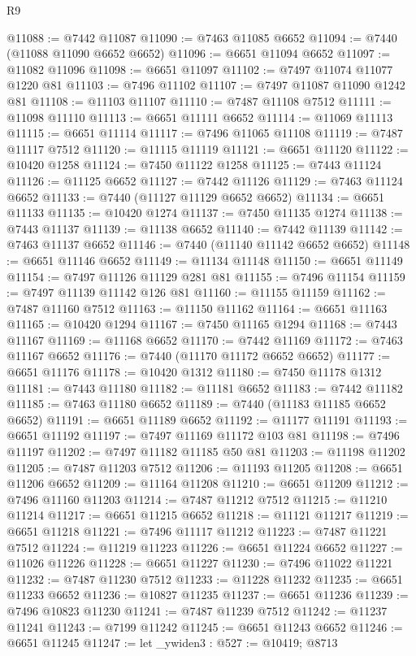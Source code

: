 \begin{lexlean}{R9}
\begin{coremodule}
@11088 := @7442 @11087
@11090 := @7463 @11085 @6652
@11094 := @7440 (@11088 @11090 @6652 @6652)
@11096 := @6651 @11094 @6652
@11097 := @11082 @11096
@11098 := @6651 @11097
@11102 := @7497 @11074 @11077 @1220 @81
@11103 := @7496 @11102
@11107 := @7497 @11087 @11090 @1242 @81
@11108 := @11103 @11107
@11110 := @7487 @11108 @7512
@11111 := @11098 @11110
@11113 := @6651 @11111 @6652
@11114 := @11069 @11113
@11115 := @6651 @11114
@11117 := @7496 @11065 @11108
@11119 := @7487 @11117 @7512
@11120 := @11115 @11119
@11121 := @6651 @11120
@11122 := @10420 @1258
@11124 := @7450 @11122 @1258
@11125 := @7443 @11124
@11126 := @11125 @6652
@11127 := @7442 @11126
@11129 := @7463 @11124 @6652
@11133 := @7440 (@11127 @11129 @6652 @6652)
@11134 := @6651 @11133
@11135 := @10420 @1274
@11137 := @7450 @11135 @1274
@11138 := @7443 @11137
@11139 := @11138 @6652
@11140 := @7442 @11139
@11142 := @7463 @11137 @6652
@11146 := @7440 (@11140 @11142 @6652 @6652)
@11148 := @6651 @11146 @6652
@11149 := @11134 @11148
@11150 := @6651 @11149
@11154 := @7497 @11126 @11129 @281 @81
@11155 := @7496 @11154
@11159 := @7497 @11139 @11142 @126 @81
@11160 := @11155 @11159
@11162 := @7487 @11160 @7512
@11163 := @11150 @11162
@11164 := @6651 @11163
@11165 := @10420 @1294
@11167 := @7450 @11165 @1294
@11168 := @7443 @11167
@11169 := @11168 @6652
@11170 := @7442 @11169
@11172 := @7463 @11167 @6652
@11176 := @7440 (@11170 @11172 @6652 @6652)
@11177 := @6651 @11176
@11178 := @10420 @1312
@11180 := @7450 @11178 @1312
@11181 := @7443 @11180
@11182 := @11181 @6652
@11183 := @7442 @11182
@11185 := @7463 @11180 @6652
@11189 := @7440 (@11183 @11185 @6652 @6652)
@11191 := @6651 @11189 @6652
@11192 := @11177 @11191
@11193 := @6651 @11192
@11197 := @7497 @11169 @11172 @103 @81
@11198 := @7496 @11197
@11202 := @7497 @11182 @11185 @50 @81
@11203 := @11198 @11202
@11205 := @7487 @11203 @7512
@11206 := @11193 @11205
@11208 := @6651 @11206 @6652
@11209 := @11164 @11208
@11210 := @6651 @11209
@11212 := @7496 @11160 @11203
@11214 := @7487 @11212 @7512
@11215 := @11210 @11214
@11217 := @6651 @11215 @6652
@11218 := @11121 @11217
@11219 := @6651 @11218
@11221 := @7496 @11117 @11212
@11223 := @7487 @11221 @7512
@11224 := @11219 @11223
@11226 := @6651 @11224 @6652
@11227 := @11026 @11226
@11228 := @6651 @11227
@11230 := @7496 @11022 @11221
@11232 := @7487 @11230 @7512
@11233 := @11228 @11232
@11235 := @6651 @11233 @6652
@11236 := @10827 @11235
@11237 := @6651 @11236
@11239 := @7496 @10823 @11230
@11241 := @7487 @11239 @7512
@11242 := @11237 @11241
@11243 := @7199 @11242
@11245 := @6651 @11243 @6652
@11246 := @6651 @11245
@11247 := let _ywiden3 : @527 := @10419; @8713

\end{coremodule}
\end{lexlean}
